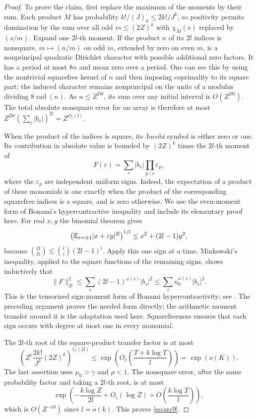 \begin{proof}
To prove the claim, first replace the maximum of the moments by their
sum.  Each product $M$ has probability
$k!/(J)_k\leq2k!/J^k$, so positivity permits domination by the sum
over all odd $m\leq(2Z)^k$ with $\chi_M(s)$ replaced by $(s/m)$.
Expand one $2l$-th moment.  If the product $n$ of its $2l$ indices is
nonsquare, $m\mapsto(n/m)$ on odd $m$, extended by zero on even
$m$, is a nonprincipal quadratic Dirichlet character with possible
additional zero factors.  It has a period at most $8n$ and mean zero
over a period.  One can see this by using the nontrivial squarefree
kernel of $n$ and then imposing coprimality to its square part;
the induced character remains nonprincipal on the units of a modulus
dividing $8\operatorname{rad}(n)$.
As $n\leq Z^{28l}$, its sum over any initial interval is
$O(Z^{28l})$.  The total absolute nonsquare error for an array is
therefore at most $Z^{28l}(\sum_s|b_s|)^{2l}=Z^{O_c(l)}$.

When the product of the indices is square, its Jacobi symbol is either
zero or one.  Its contribution in absolute value is bounded by
$(2Z)^k$ times the $2l$-th moment of
\[
 F(\varepsilon)=\sum_s|b_s|\prod_{p\mid s}\varepsilon_p,
\]
where the $\varepsilon_p$ are independent uniform signs.
Indeed, the expectation of a product of these monomials is one
exactly when the product of the corresponding squarefree indices is
a square, and is zero otherwise.
We use the even-moment form of Bonami's hypercontractive inequality
\cite[Chapter~III, Theorems~2--3]{Bonami1970} and include its elementary
proof here.
For real $x,y$ the binomial theorem gives
\[
 \left(\mathbb E_{\varepsilon=\pm1}|x+\varepsilon y|^{2l}\right)^{1/l}
 \leq x^2+(2l-1)y^2,
\]
because
$\binom{2l}{2i}\leq\binom li(2l-1)^i$.
Apply this one sign at a time.  Minkowski's inequality, applied to
the square functions of the remaining signs, shows inductively that
\[
 \|F\|_{2l}^2\leq
       \sum_s(2l-1)^{\omega(s)}|b_s|^2
 \leq\sum_su_0^{\omega(s)}|b_s|^2.
\]
This is the tensorized sign-moment form of Bonami hypercontractivity;
see \cite[Chapter~III, Theorem~3, p.~376]{Bonami1970}. The preceding
argument proves the needed form directly; the arithmetic moment transfer
around it is the adaptation used here. Squarefreeness ensures that each
sign occurs with degree at most one in every monomial.

The $2l$-th root of the square-product transfer factor is at most
\[
 \left(Z^c\frac{2k!}{J^k}(2Z)^k\right)^{1/(2l)}
 \leq\exp\left(O_c\left(\frac{T+k\log T}{l}\right)\right)
 =\exp(o(K)).
\]
The last assertion uses $\mu_0>\gamma$ and $\rho<1$.
The nonsquare error, after the same probability factor and taking a
$2l$-th root, is at most
\[
 \exp\left(-\frac{k\log Z}{2l}
            +O_c(\log Z)+O\left(\frac{k\log T}{l}\right)\right),
\]
which is $O(Z^{-10})$ since $l=o(k)$.  This proves
\eqref{eq:src9}.


\end{proof}
